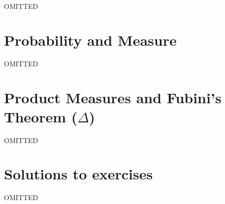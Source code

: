 \documentclass[a4paper]{report}
\numberwithin{equation}{chapter}
\numberwithin{thm_counter}{section}
\begin{document}
OMITTED


\chapter{Probability and Measure}
\label{chap:prob_with_meas}

OMITTED



\chapter{Product Measures and Fubini's Theorem ($\Delta$)}
\label{chap:product_meas}

OMITTED



\appendix


\chapter{Solutions to exercises}


OMITTED




\begin{warpprint}   %
\cleardoublepage    %
{}
\end{warpprint}
\ForceHTMLPage      %
\ForceHTMLTOC       %
\printindex
\end{document}

